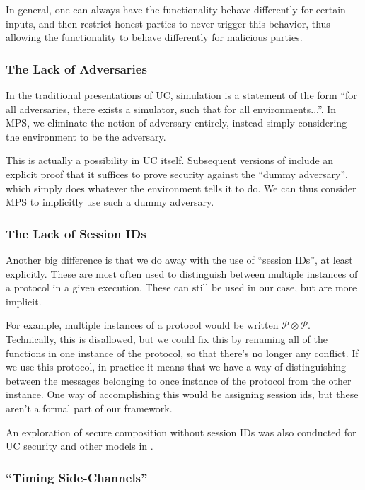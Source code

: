 In general, one can always have the functionality
behave differently for certain inputs,
and then restrict honest parties to never trigger this behavior,
thus allowing the functionality to behave differently
for malicious parties.

\subsubsection*{The Lack of Adversaries}

In the traditional presentations of UC,
simulation is a statement of the form ``for all adversaries,
there exists a simulator, such that for all environments...''.
In MPS, we eliminate the notion of adversary
entirely, instead simply considering the environment
to be the adversary.

This is actually a possibility in UC itself.
Subsequent versions of \cite{EPRINT:Canetti00} include
an explicit proof that it suffices to prove security against the ``dummy adversary'',
which simply does whatever the environment tells it to do.
We can thus consider MPS to implicitly use such a dummy adversary.

\subsubsection*{The Lack of Session IDs}

Another big difference is that we do away with the use of ``session IDs'',
at least explicitly.
These are most often used to distinguish between multiple
instances of a protocol in a given execution.
These can still be used in our case, but are more implicit.

For example, multiple instances of a protocol would be written
$\mathscr{P} \otimes \mathscr{P}$.
Technically, this is disallowed, but we could fix this
by renaming all of the functions in one instance of the protocol,
so that there's no longer any conflict.
If we use this protocol, in practice it means that we
have a way of distinguishing between the messages belonging
to once instance of the protocol from the other instance.
One way of accomplishing this would be assigning session ids,
but these aren't a formal part of our framework.

An exploration of secure composition without session IDs
was also conducted for UC security and other models
in \cite{CCS:KusTue11}.

\subsubsection*{``Timing Side-Channels''}

